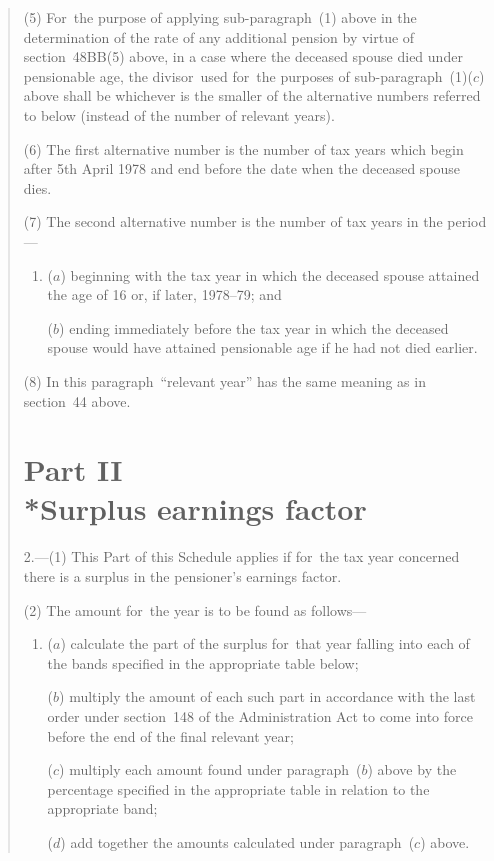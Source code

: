 \documentclass[12pt,a4paper]{article}
\begin{document}
\begin{quotation}
(5) For~the purpose of applying sub-paragraph~(1)  above in the determination of the rate of any additional pension by virtue of section~48BB(5)  above, in a case where the deceased spouse died under pensionable age, the divisor~used for~the purposes of sub-paragraph~(1)($c$)  above shall be whichever is the smaller of the alternative numbers referred to below (instead of the number of relevant years).

(6) The first alternative number is the number of tax years which begin after 5th April 1978 and end before the date when the deceased spouse dies.

(7) The second alternative number is the number of tax years in the period—
\begin{enumerate}\item[]
($a$) beginning with the tax year in which the deceased spouse attained the age of 16 or, if later, 1978--79; and

($b$) ending immediately before the tax year in which the deceased spouse would have attained pensionable age if he had not died earlier.
\end{enumerate}

(8) In this paragraph~“relevant year” has the same meaning as in section~44 above.

\section*{Part II\\*Surplus earnings factor}

2.---(1) This Part of this Schedule applies if for~the tax year concerned there is a surplus in the pensioner’s earnings factor.

(2) The amount for~the year is to be found as follows—
\begin{enumerate}\item[]
($a$) calculate the part of the surplus for~that year falling into each of the bands specified in the appropriate table below;

($b$) multiply the amount of each such part in accordance with the last order under section~148 of the Administration Act to come into force before the end of the final relevant year;

($c$) multiply each amount found under paragraph~($b$)  above by the percentage specified in the appropriate table in relation to the appropriate band;

\begin{sloppypar}
($d$) add together the amounts calculated under paragraph~($c$)  above.
\end{sloppypar}
\end{enumerate}


\end{quotation}
\end{document}
